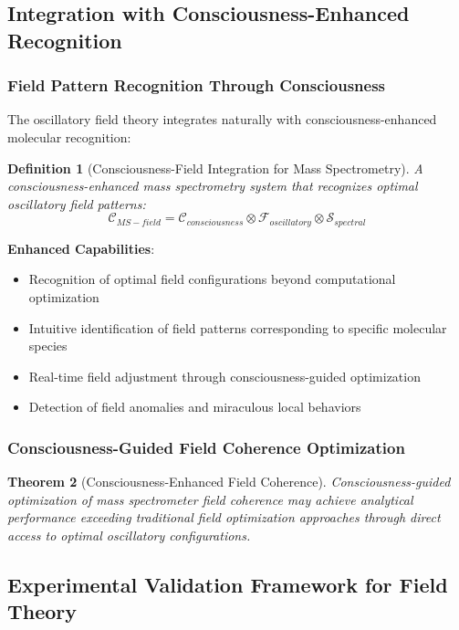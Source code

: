 \documentclass[11pt,a4paper]{article}
\newtheorem{theorem}{Theorem}[section]
\newtheorem{definition}[theorem]{Definition}
\theoremstyle{remark}
\begin{document}
\subsection{Integration with Consciousness-Enhanced Recognition}

\subsubsection{Field Pattern Recognition Through Consciousness}

The oscillatory field theory integrates naturally with consciousness-enhanced molecular recognition:

\begin{definition}[Consciousness-Field Integration for Mass Spectrometry]
A consciousness-enhanced mass spectrometry system that recognizes optimal oscillatory field patterns:
\begin{equation}
\mathcal{C}_{MS-field} = \mathcal{C}_{consciousness} \otimes \mathcal{F}_{oscillatory} \otimes \mathcal{S}_{spectral}
\end{equation}
\end{definition}

\textbf{Enhanced Capabilities}:
\begin{itemize}
\item Recognition of optimal field configurations beyond computational optimization
\item Intuitive identification of field patterns corresponding to specific molecular species
\item Real-time field adjustment through consciousness-guided optimization
\item Detection of field anomalies and miraculous local behaviors
\end{itemize}

\subsubsection{Consciousness-Guided Field Coherence Optimization}

\begin{theorem}[Consciousness-Enhanced Field Coherence]
Consciousness-guided optimization of mass spectrometer field coherence may achieve analytical performance exceeding traditional field optimization approaches through direct access to optimal oscillatory configurations.
\end{theorem}

\subsection{Experimental Validation Framework for Field Theory}
\end{document}
